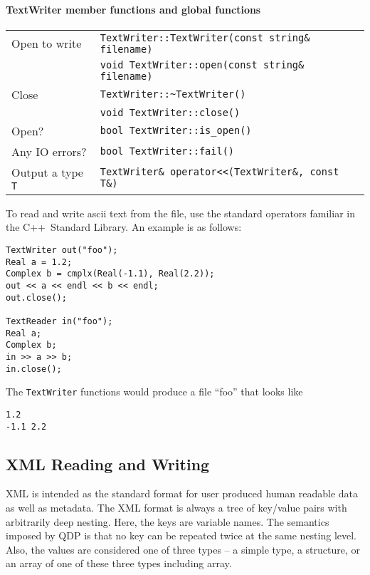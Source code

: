 \documentclass[12pt,letterpaper]{article}
\newcommand{\cpp}{C++}
\begin{document}
\paragraph{TextWriter member functions and global functions}

\begin{flushleft}
  \begin{tabular}{|l|l|}
  \hline
  Open to write  & \verb|TextWriter::TextWriter(const string& filename)|\\
                 & \verb|void TextWriter::open(const string& filename)|\\
  \hline
  Close          & \verb|TextWriter::~TextWriter()|\\
                 & \verb|void TextWriter::close()|\\
  \hline
  Open?          & \verb|bool TextWriter::is_open()| \\
  \hline
  Any IO errors? & \verb|bool TextWriter::fail()| \\
  \hline
  Output a type \verb|T| & \verb|TextWriter& operator<<(TextWriter&, const T&)| \\
  \hline
 \end{tabular}
\end{flushleft}
%
To read and write ascii text from the file, use the standard operators
familiar in the \cpp\ Standard Library. An example is as follows:
%
\begin{small}
\begin{verbatim}
TextWriter out("foo");
Real a = 1.2;
Complex b = cmplx(Real(-1.1), Real(2.2));
out << a << endl << b << endl;
out.close();

TextReader in("foo");
Real a;
Complex b;
in >> a >> b;
in.close();
\end{verbatim}
\end{small}
%
The \verb|TextWriter| functions would produce a file ``foo'' that looks
like
\begin{verbatim}
1.2
-1.1 2.2
\end{verbatim}

\subsection{XML Reading and Writing}
\label{sec:xmlio}

XML is intended as the standard format for user produced human
readable data as well as metadata. The XML format is always a tree of
key/value pairs with arbitrarily deep nesting. Here, the keys are
variable names. The semantics imposed by QDP is that no key can be
repeated twice at the same nesting level. Also, the values are considered
one of three types -- a simple type, a structure, or an array of one of these
three types including array.
\end{document}
